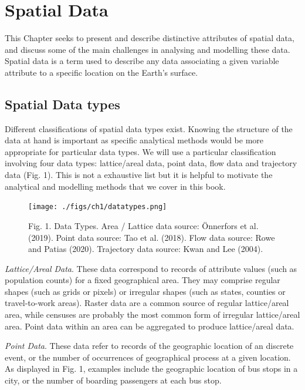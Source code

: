 \documentclass[
  letterpaper,
  DIV=11,
  numbers=noendperiod]{scrreprt}
\begin{document}
\hypertarget{spatial_data}{%
\chapter{Spatial Data}\label{spatial_data}}

This Chapter seeks to present and describe distinctive attributes of
spatial data, and discuss some of the main challenges in analysing and
modelling these data. Spatial data is a term used to describe any data
associating a given variable attribute to a specific location on the
Earth's surface.

\hypertarget{spatial-data-types}{%
\section{Spatial Data types}\label{spatial-data-types}}

Different classifications of spatial data types exist. Knowing the
structure of the data at hand is important as specific analytical
methods would be more appropriate for particular data types. We will use
a particular classification involving four data types: lattice/areal
data, point data, flow data and trajectory data (Fig. 1). This is not a
exhaustive list but it is helpful to motivate the analytical and
modelling methods that we cover in this book.

\begin{figure}

{\centering \texttt{[image: ./figs/ch1/datatypes.png]}

}

\caption{Fig. 1. Data Types. Area / Lattice data source: Önnerfors et
al. (2019). Point data source: Tao et al. (2018). Flow data source: Rowe
and Patias (2020). Trajectory data source: Kwan and Lee (2004).}

\end{figure}

\emph{Lattice/Areal Data}. These data correspond to records of attribute
values (such as population counts) for a fixed geographical area. They
may comprise regular shapes (such as grids or pixels) or irregular
shapes (such as states, counties or travel-to-work areas). Raster data
are a common source of regular lattice/areal area, while censuses are
probably the most common form of irregular lattice/areal area. Point
data within an area can be aggregated to produce lattice/areal data.

\emph{Point Data}. These data refer to records of the geographic
location of an discrete event, or the number of occurrences of
geographical process at a given location. As displayed in Fig. 1,
examples include the geographic location of bus stops in a city, or the
number of boarding passengers at each bus stop.
\end{document}
